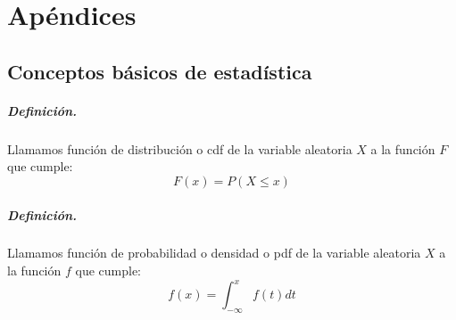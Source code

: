 
%
%
%
%
%
%
%
%

\chapter{Ap\'endices}
\label{sec:apendixes}


\section{Conceptos b\'asicos de estad\'istica}

\paragraph{Definici\'on.} Llamamos funci\'on de distribuci\'on o cdf de la
variable aleatoria $X$ a la funci\'on $F$ que cumple:
\begin{displaymath}
F(x) = P(X \leq x)
\end{displaymath}

\paragraph{Definici\'on.} Llamamos funci\'on de probabilidad o densidad o pdf
 de la variable aleatoria $X$ a la funci\'on $f$ que cumple:
\begin{displaymath}
f(x) = \int_{-\infty}^{x} f(t) dt
\end{displaymath}

